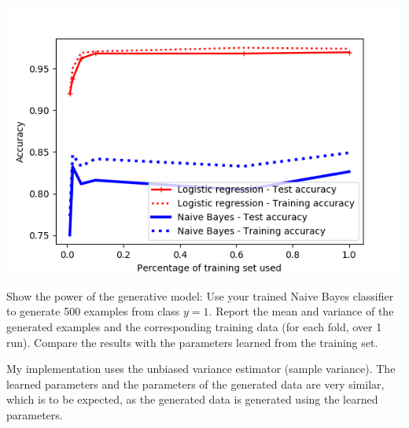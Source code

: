 \documentclass[11pt,largemargins]{homework}
\begin{document}
\begin{alphaparts}
\begin{arabicparts}
	\begin{center}
		\includegraphics[scale=0.7]{Figure_1.png}
	\end{center}
	\questionpart
	Show the power of the generative model: Use your trained Naive Bayes classifier to generate 500 examples from class $y=1$. Report the mean and variance of the generated examples and the corresponding training data (for each fold, over 1 run). Compare the results with the parameters learned from the training set.

	My implementation uses the unbiased variance estimator (sample variance). The learned parameters and the parameters of the generated data are very similar, which is to be expected, as the generated data is generated using the learned parameters.
	
\end{arabicparts}
\end{alphaparts}
\end{document}
